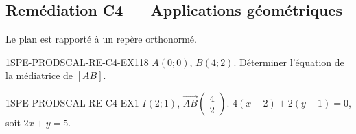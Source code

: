 
\subsection*{Remédiation C4 — Applications géométriques}

Le plan est rapporté à un repère orthonormé.

\begin{exercice}{1SPE-PRODSCAL-RE-C4-EX1}{1}{8}
$A(0;0)$, $B(4;2)$. Déterminer l'équation de la médiatrice de $[AB]$.
\end{exercice}


\begin{corrige}{1SPE-PRODSCAL-RE-C4-EX1}
$I(2;1)$, $\overrightarrow{AB}\begin{pmatrix} 4 \\ 2 \end{pmatrix}$. $4(x-2)+2(y-1)=0$, soit $2x+y=5$.
\end{corrige}

